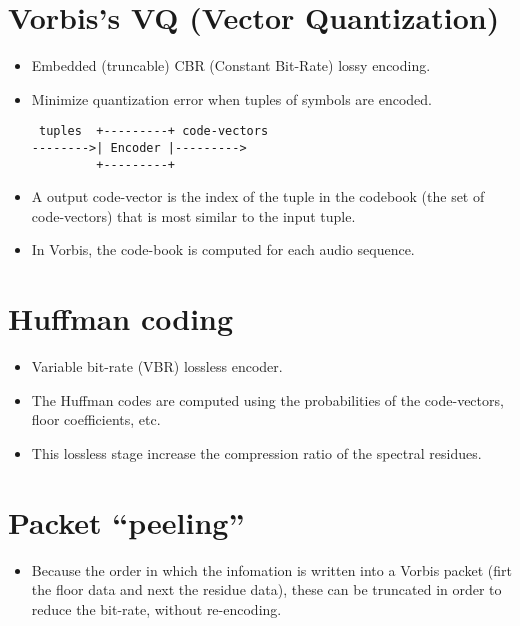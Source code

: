 \begin{itemize}

\section{Vorbis's VQ (Vector Quantization)}

\begin{itemize}
\item Embedded (truncable) CBR (Constant Bit-Rate) lossy encoding.
\item Minimize quantization error when tuples of symbols are encoded.
\begin{center}
\begin{verbatim}
 tuples  +---------+ code-vectors
-------->| Encoder |--------->
         +---------+
\end{verbatim}
\end{center}
\item A output code-vector is the index of the tuple in the codebook
  (the set of code-vectors) that is most similar to the input tuple.
\item In Vorbis, the code-book is computed for each audio sequence.
\end{itemize}


\section{Huffman coding}

\begin{itemize}
\item Variable bit-rate (VBR) lossless encoder.
\item The Huffman codes are computed using the probabilities of the
  code-vectors, floor coefficients, etc.
\item This lossless stage increase the compression ratio of the
  spectral residues.
\end{itemize}


\section{Packet ``peeling''}
\begin{itemize}
\item Because the order in which the infomation is written into a
  Vorbis packet (firt the floor data and next the residue data), these
  can be truncated in order to reduce the bit-rate, without
  re-encoding.
\end{itemize}


\end{itemize}
